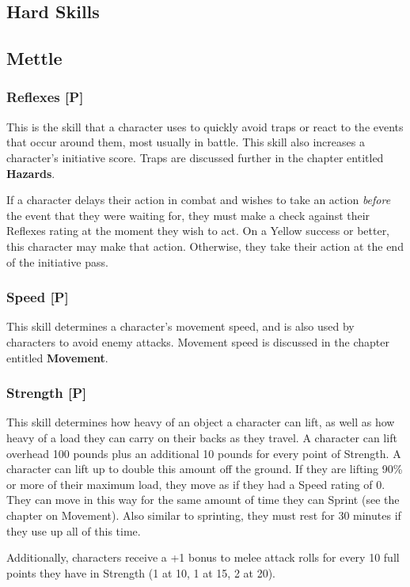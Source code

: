 \documentclass[oneside]{book}
\begin{document}
\begin{multicols}{2}

\section{Hard Skills}
\subsection{Mettle}
\subsubsection{Reflexes [P]}
This is the skill that a character uses to quickly avoid traps or react to the events that occur around them, most usually in battle. This skill also increases a character's initiative score. Traps are discussed further in the chapter entitled \textbf{Hazards}.

If a character delays their action in combat and wishes to take an action \emph{before} the event that they were waiting for, they must make a check against their Reflexes rating at the moment they wish to act. On a Yellow success or better, this character may make that action. Otherwise, they take their action at the end of the initiative pass.

\subsubsection{Speed [P]}
This skill determines a character's movement speed, and is also used by characters to avoid enemy attacks. Movement speed is discussed in the chapter entitled \textbf{Movement}.

\subsubsection{Strength [P]}
This skill determines how heavy of an object a character can lift, as well as how heavy of a load they can carry on their backs as they travel. A character can lift overhead 100 pounds plus an additional 10 pounds for every point of Strength. A character can lift up to double this amount off the ground. If they are lifting 90\% or more of their maximum load, they move as if they had a Speed rating of 0. They can move in this way for the same amount of time they can Sprint (see the chapter on Movement). Also similar to sprinting, they must rest for 30 minutes if they use up all of this time.  

Additionally, characters receive a +1 bonus to melee attack rolls for every 10 full points they have in Strength (1 at 10, 1 at 15, 2 at 20).


\end{multicols}
\end{document}

